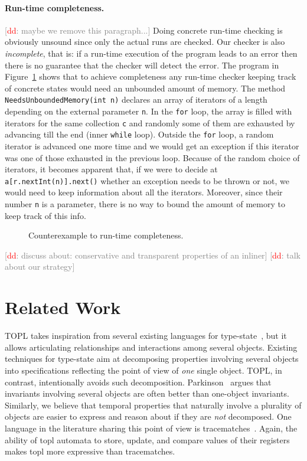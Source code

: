 \documentclass{sigplanconf}[10pt] %
\newcommand{\noterg}[2]{\textcolor{gray}{[\textcolor{red}{#1}: #2]}}
\newcommand{\dd}[1]{\noterg{dd}{#1}}
\newcommand{\dinocomment}[1]{\dd{#1}}
\begin{document}
\paragraph{Run-time completeness.}
\dinocomment{maybe we remove this paragraph...}
Doing concrete run-time checking is obviously unsound since only the actual runs are checked.
Our checker is also {\em incomplete}, that is:
if a run-time execution of the program leads to an error then there is no guarantee that the checker will detect the error.
The program in Figure~\ref{fig:completeness} shows that to achieve completeness any run-time checker keeping track of concrete states would need an unbounded amount of memory.
The method {\tt NeedsUnboundedMemory(int n)}
declares an array of iterators of a length depending on the external parameter {\tt n}.
 In the {\tt for} loop, the array is filled with iterators for the same collection {\tt c} and randomly some of them are exhausted by advancing till the end (inner {\tt while} loop).
Outside the {\tt for} loop, a random iterator is advanced one more time and we would get an exception if this iterator was one of those exhausted in the previous loop.
Because of the random choice of iterators, it becomes apparent that, if we were to decide at {\tt a[r.nextInt(n)].next()} whether an exception needs to be thrown or not, we would need to keep information about all the iterators.
Moreover, since their number {\tt n} is a parameter, there is no way to bound the amount of memory to keep track of this info.
\begin{figure}[htbp]
\begin{center}

\caption{Counterexample to run-time completeness.}
\label{fig:completeness}
\end{center}
\end{figure}

\dinocomment{discuss about: conservative and transparent properties of an inliner}
\dinocomment{talk about our strategy}

\section{Related Work}\label{sec:related} %

TOPL takes inspiration from several existing  languages for type-state~\cite{strom1986,dblp:conf/oopsla/bierhoffa07,dblp:conf/oopsla/naeeml08,disney2011,ball2002}, but  it allows articulating  relationships and interactions among several objects.
Existing techniques for type-state aim at decomposing properties involving several objects into specifications reflecting the point of view of {\em one} single object.
TOPL, in contrast,  intentionally avoids such decomposition.
Parkinson~\cite{parkinson-iwaco2007} argues that invariants involving several objects are often better than one-object invariants.
Similarly, we believe that temporal properties that naturally involve a plurality of objects are easier to express and reason about if they are \emph{not} decomposed.
One language in the literature sharing this point of view is tracematches~\cite{dblp:conf/oopsla/allanachklmsst05}.
Again, the ability of topl automata to store,  update, and compare values of their registers makes topl more expressive than tracematches.
\end{document}
